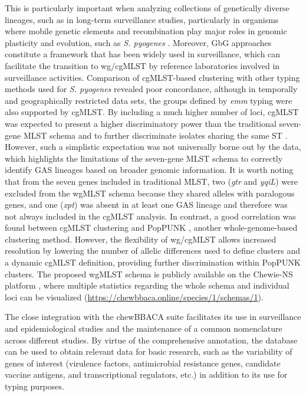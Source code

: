 This is particularly important when analyzing collections of genetically diverse lineages, such as in long-term surveillance studies, particularly in organisms where mobile genetic elements and recombination play major roles in genomic plasticity and evolution, such as \textit{S. pyogenes} \cite{davies_atlas_2019, mcgregor_multilocus_2004}. Moreover, \ac{GbG} approaches constitute a framework that has been widely used in surveillance, which can facilitate the transition to \ac{wg/cgMLST} by reference laboratories involved in surveillance activities. Comparison of \ac{cgMLST}-based clustering with other typing methods used for \textit{S. pyogenes} revealed poor concordance, although in temporally and geographically restricted data sets, the groups defined by \textit{emm} typing were also supported by \ac{cgMLST}. By including a much higher number of loci, \ac{cgMLST} was expected to present a higher discriminatory power than the traditional seven-gene \ac{MLST} schema and to further discriminate isolates sharing the same \ac{ST} \cite{neumann_core_2019, bletz_defining_2018}. However, such a simplistic expectation was not universally borne out by the data, which highlights the limitations of the seven-gene \ac{MLST} schema to correctly identify \ac{GAS} lineages based on broader genomic information. It is worth noting that from the seven genes included in traditional \ac{MLST}, two (\textit{gtr} and \textit{yqiL}) were excluded from the \ac{wgMLST} schema because they shared alleles with paralogous genes, and one (\textit{xpt}) was absent in at least one \ac{GAS} lineage and therefore was not always included in the \ac{cgMLST} analysis. In contrast, a good correlation was found between \ac{cgMLST} clustering and \ac{PopPUNK} \cite{davies_atlas_2019, lees_fast_2019}, another whole-genome-based clustering method. However, the flexibility of \ac{wg/cgMLST} allows increased resolution by lowering the number of allelic differences used to define clusters and a dynamic \ac{cgMLST} definition, providing further discrimination within \ac{PopPUNK} clusters. The proposed \ac{wgMLST} schema is publicly available on the \ac{Chewie-NS} platform \cite{mamede_chewie_2021}, where multiple statistics regarding the whole schema and individual loci can be visualized (\url{https://chewbbaca.online/species/1/schemas/1}).

The close integration with the chewBBACA suite \cite{silva_chewbbaca_2018} facilitates its use in surveillance and epidemiological studies and the maintenance of a common nomenclature across different studies. By virtue of the comprehensive annotation, the database can be used to obtain relevant data for basic research, such as the variability of genes of interest (virulence factors, antimicrobial resistance genes, candidate vaccine antigens, and transcriptional regulators, etc.) \cite{davies_atlas_2019, beres_integrative_2022} in addition to its use for typing purposes.

